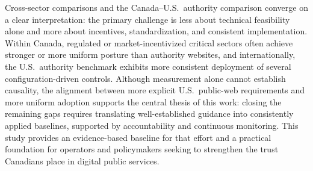 \documentclass[a4paper,fleqn]{cas-sc}
\begin{document}
Cross-sector comparisons and the Canada--U.S.\ authority comparison converge on a clear interpretation: the primary challenge is less about technical feasibility alone and more about incentives, standardization, and consistent implementation.
Within Canada, regulated or market-incentivized critical sectors often achieve stronger or more uniform posture than authority websites, and internationally, the U.S.\ authority benchmark exhibits more consistent deployment of several configuration-driven controls.
Although measurement alone cannot establish causality, the alignment between more explicit U.S.\ public-web requirements and more uniform adoption supports the central thesis of this work: closing the remaining gaps requires translating well-established guidance into consistently applied baselines, supported by accountability and continuous monitoring.
This study provides an evidence-based baseline for that effort and a practical foundation for operators and policymakers seeking to strengthen the trust Canadians place in digital public services.
\end{document}
